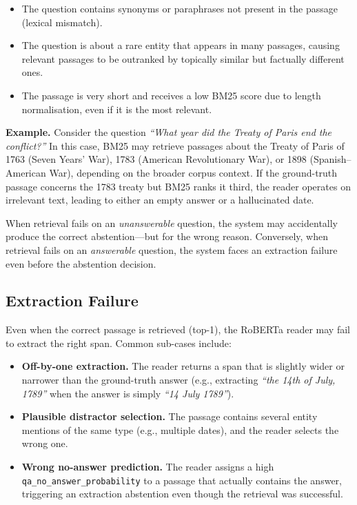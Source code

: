 \begin{itemize}
  \item The question contains synonyms or paraphrases not present in the
        passage (lexical mismatch).
  \item The question is about a rare entity that appears in many passages,
        causing relevant passages to be outranked by topically similar but
        factually different ones.
  \item The passage is very short and receives a low BM25 score due to length
        normalisation, even if it is the most relevant.
\end{itemize}

\noindent \textbf{Example.} Consider the question \textit{``What year did the
Treaty of Paris end the conflict?''} In this case, BM25 may retrieve passages
about the Treaty of Paris of 1763 (Seven Years' War), 1783 (American
Revolutionary War), or 1898 (Spanish–American War), depending on the broader
corpus context. If the ground-truth passage concerns the 1783 treaty but BM25
ranks it third, the reader operates on irrelevant text, leading to either an
empty answer or a hallucinated date.

When retrieval fails on an \emph{unanswerable} question, the system may
accidentally produce the correct abstention—but for the wrong reason.
Conversely, when retrieval fails on an \emph{answerable} question, the system
faces an extraction failure even before the abstention decision.

\subsection{Extraction Failure}
\label{sec:err_extraction}

Even when the correct passage is retrieved (top-1), the RoBERTa reader may fail
to extract the right span. Common sub-cases include:

\begin{itemize}
  \item \textbf{Off-by-one extraction.} The reader returns a span that is
        slightly wider or narrower than the ground-truth answer (e.g.,
        extracting \textit{``the 14th of July, 1789''} when the answer is
        simply \textit{``14 July 1789''}).

  \item \textbf{Plausible distractor selection.} The passage contains
        several entity mentions of the same type (e.g., multiple dates), and
        the reader selects the wrong one.

  \item \textbf{Wrong no-answer prediction.} The reader assigns a high
        \texttt{qa\_no\_answer\_probability} to a passage that actually
        contains the answer, triggering an extraction abstention even though
        the retrieval was successful.
\end{itemize}

